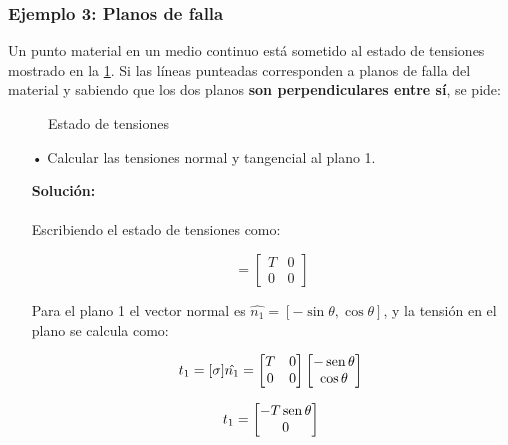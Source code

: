 \documentclass[../notas medios.tex]{subfiles}
\begin{document}
\subsubsection*{Ejemplo 3: Planos de falla}
Un punto material en un medio continuo est\'a sometido al estado de tensiones mostrado en la \cref{punto}. Si las líneas punteadas corresponden a planos de falla del material y sabiendo que los dos planos {\bf son perpendiculares entre sí}, se pide:

\begin{figure}[H]
	\centering
	\caption{Estado de tensiones}
	\label{punto}
\end{figure}
%
\begin{itemize}

\item[•] Calcular las tensiones normal y tangencial al plano 1.

\textbf{Solución:}\\\\

Escribiendo el estado de tensiones como:

\begin{equation*}
[\sigma]
= 
\begin{bmatrix}
    T & 0 \\
    0 & 0
\end{bmatrix}
\end{equation*}

Para el plano 1 el vector normal es $\hat{n_1}=[ -\sin{\theta}, \cos{\theta} ]$, y la tensi\'on en el plano se calcula como:

\begin{equation*}
t_1 = [\sigma]\hat{n_1}
= 
\begin{bmatrix}
    T & 0 \\
    0 & 0
\end{bmatrix}
\begin{bmatrix}
   -\sin{\theta} \\
    \cos{\theta} \\
\end{bmatrix} \\
\end{equation*}

\begin{equation*}
t_1 = 
\begin{bmatrix}
    -T\sin{\theta} \\
    0 
\end{bmatrix} \\
\end{equation*}


\end{itemize}
\end{document}
